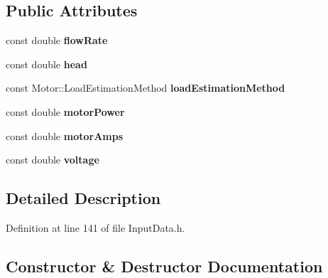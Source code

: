 \subsection*{Public Attributes}
\begin{DoxyCompactItemize}
\item 
\mbox{\label{struct_pump_1_1_field_data_a84c512ac749541c91b2fbe6d3f971182}} 
const double {\bfseries flow\+Rate}
\item 
\mbox{\label{struct_pump_1_1_field_data_abc76e0e2dc15fb4d97fbe39405912e60}} 
const double {\bfseries head}
\item 
\mbox{\label{struct_pump_1_1_field_data_a26ec49662d5866c00ddb8df278261321}} 
const Motor\+::\+Load\+Estimation\+Method {\bfseries load\+Estimation\+Method}
\item 
\mbox{\label{struct_pump_1_1_field_data_a2b39c288d86eda22190818bbf1672d28}} 
const double {\bfseries motor\+Power}
\item 
\mbox{\label{struct_pump_1_1_field_data_a9610ce4050705dfad60b159e6dec8bfa}} 
const double {\bfseries motor\+Amps}
\item 
\mbox{\label{struct_pump_1_1_field_data_a2b09518966e012112d44c78439ef28ba}} 
const double {\bfseries voltage}
\end{DoxyCompactItemize}


\subsection{Detailed Description}


Definition at line 141 of file Input\+Data.\+h.



\subsection{Constructor \& Destructor Documentation}
\mbox{\label{struct_pump_1_1_field_data_ad35a6b6b9a02174c0e32ed6adebb8b75}} 
